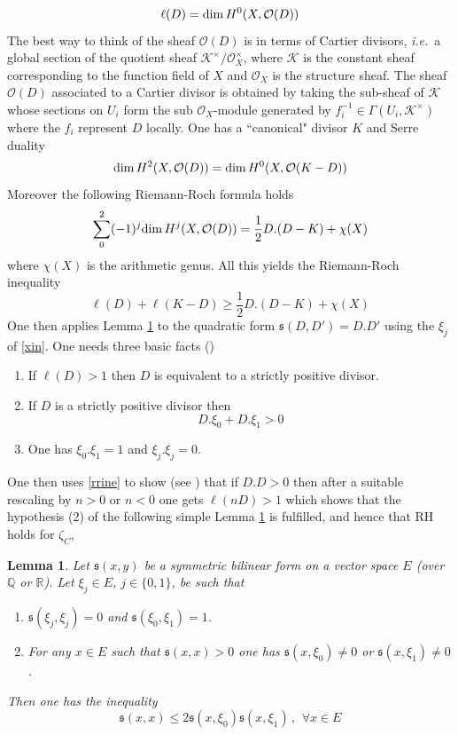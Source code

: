 \documentclass[12pt]{article}
\newtheorem{lem}[thm]{Lemma}
\def\qqq{\,,\quad~\forall}
\def\Q{{\mathbb Q}}
\def\R{{\mathbb R}}
\def\inter{{\mathfrak s}}
\def\cK{{\mathcal K}}
\def\cO{{\mathcal O}}
\def\qqq{\,,\,~\forall}
\newcommand{\ie}{{\it i.e.\/}\ }
\begin{document}
\begin{equation}\label{dim}
    \ell(D)={\rm dim}\, H^0(X,\cO(D))
\end{equation}
The best way to think of the sheaf $\cO(D)$ is in terms of Cartier divisors, \ie a global section of the quotient sheaf $\cK^\times/\cO_X^\times$, where $\cK$ is the constant sheaf corresponding to the function field  of $X$ and $\cO_X$ is the structure sheaf. The sheaf $\cO(D)$ associated to a Cartier divisor is obtained by taking the sub-sheaf of $\cK$ whose sections on $U_i$ form the sub $\cO_X$-module generated by $f_i^{-1}\in \Gamma(U_i,\cK^\times)$ where the $f_i$ represent $D$ locally. One has a ``canonical" divisor $K$ and Serre duality
\begin{equation}\label{Sdual}
    {\rm dim}\, H^2(X,\cO(D))={\rm dim}\, H^0(X,\cO(K-D))
\end{equation}
Moreover the following Riemann-Roch formula holds
\begin{equation}\label{RRform}
    \sum_0^2(-1)^j {\rm dim}\, H^j(X,\cO(D))=\frac 12 D.(D-K)+\chi(X)
\end{equation}
where $\chi(X)$ is the arithmetic genus.
All this yields the Riemann-Roch  inequality
\begin{equation}\label{rrine}
    \ell(D)+ \ell(K-D)\geq \frac 12 D.(D-K)+\chi(X)
\end{equation}
One then applies Lemma \ref{simplelem1} to the quadratic form $\inter(D,D')=D.D'$ using the
$\xi_j$ of \eqref{xin}. One needs three basic facts (\cite{grmt})
\begin{enumerate}
  \item If $\ell(D)>1$ then $D$ is equivalent to a strictly positive divisor.
  \item If $D$ is a strictly positive divisor then
  $$ D.\xi_0+D. \xi_1>0$$
  \item One has $\xi_0.\xi_1=1$ and $\xi_j.\xi_j=0$.
\end{enumerate}
One then uses \eqref{rrine} to show (see \cite{grmt}) that if $D.D>0$ then after a suitable rescaling by $n>0$ or $n<0$ one gets $\ell(nD)>1$ which shows that the hypothesis (2) of the following simple Lemma \ref{simplelem1} is fulfilled, and hence that RH holds for $\zeta_C$,
 \begin{lem} \label{simplelem1} Let $\inter(x,y)$ be a symmetric bilinear form on a  vector space $E$ (over $\Q$ or $\R$). Let $\xi_j \in E$, $j\in \{0,1\}$, be such that
\begin{enumerate}
  \item $\inter(\xi_j,\xi_j)=0$ and $\inter(\xi_0,\xi_1)=1$.
  \item For any $x\in E$ such that $\inter(x,x)>0$ one has $\inter(x,\xi_0)\neq 0$ or $\inter(x,\xi_1)\neq 0$.
 \end{enumerate}
 Then  one has the inequality
 \begin{equation}\label{negative4}
    \inter(x,x)\leq 2 \inter(x,\xi_0)\inter(x,\xi_1)\qqq x\in E
 \end{equation}
\end{lem}
\end{document}
